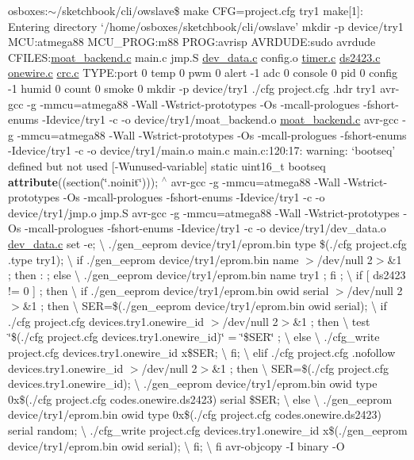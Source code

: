 osboxes\-:$\sim$/sketchbook/cli/owslave\$ make C\-F\-G=project.\-cfg try1 make\mbox{[}1\mbox{]}\-: Entering directory `/home/osboxes/sketchbook/cli/owslave' mkdir -\/p device/try1 M\-C\-U\-:atmega88 M\-C\-U\-\_\-\-P\-R\-O\-G\-:m88 P\-R\-O\-G\-:avrisp A\-V\-R\-D\-U\-D\-E\-:sudo avrdude C\-F\-I\-L\-E\-S\-:\hyperlink{moat__backend_8c}{moat\-\_\-backend.\-c} main.\-c jmp.\-S \hyperlink{dev__data_8c}{dev\-\_\-data.\-c} config.\-o \hyperlink{timer_8c}{timer.\-c} \hyperlink{ds2423_8c}{ds2423.\-c} \hyperlink{onewire_8c}{onewire.\-c} \hyperlink{crc_8c}{crc.\-c} T\-Y\-P\-E\-:port 0 temp 0 pwm 0 alert -\/1 adc 0 console 0 pid 0 config -\/1 humid 0 count 0 smoke 0 mkdir -\/p device/try1 ./cfg project.\-cfg .hdr try1 avr-\/gcc -\/g -\/mmcu=atmega88 -\/\-Wall -\/\-Wstrict-\/prototypes -\/\-Os -\/mcall-\/prologues -\/fshort-\/enums -\/\-Idevice/try1 -\/c -\/o device/try1/moat\-\_\-backend.\-o \hyperlink{moat__backend_8c}{moat\-\_\-backend.\-c} avr-\/gcc -\/g -\/mmcu=atmega88 -\/\-Wall -\/\-Wstrict-\/prototypes -\/\-Os -\/mcall-\/prologues -\/fshort-\/enums -\/\-Idevice/try1 -\/c -\/o device/try1/main.\-o main.\-c main.\-c\-:120\-:17\-: warning\-: ‘bootseq’ defined but not used \mbox{[}-\/\-Wunused-\/variable\mbox{]} static uint16\-\_\-t bootseq {\bfseries attribute}((section(\char`\"{}.\-noinit\char`\"{}))); $^\wedge$ avr-\/gcc -\/g -\/mmcu=atmega88 -\/\-Wall -\/\-Wstrict-\/prototypes -\/\-Os -\/mcall-\/prologues -\/fshort-\/enums -\/\-Idevice/try1 -\/c -\/o device/try1/jmp.\-o jmp.\-S avr-\/gcc -\/g -\/mmcu=atmega88 -\/\-Wall -\/\-Wstrict-\/prototypes -\/\-Os -\/mcall-\/prologues -\/fshort-\/enums -\/\-Idevice/try1 -\/c -\/o device/try1/dev\-\_\-data.\-o \hyperlink{dev__data_8c}{dev\-\_\-data.\-c} set -\/e; \textbackslash{} ./gen\-\_\-eeprom device/try1/eprom.\-bin type \$(./cfg project.\-cfg .type try1); \textbackslash{} if ./gen\-\_\-eeprom device/try1/eprom.\-bin name $>$/dev/null 2$>$\&1 ; then \-: ; else \textbackslash{} ./gen\-\_\-eeprom device/try1/eprom.\-bin name try1 ; fi ; \textbackslash{} if \mbox{[} ds2423 != 0 \mbox{]} ; then \textbackslash{} if ./gen\-\_\-eeprom device/try1/eprom.\-bin owid serial $>$/dev/null 2$>$\&1 ; then \textbackslash{} S\-E\-R=\$(./gen\-\_\-eeprom device/try1/eprom.\-bin owid serial); \textbackslash{} if ./cfg project.\-cfg devices.\-try1.\-onewire\-\_\-id $>$/dev/null 2$>$\&1 ; then \textbackslash{} test \char`\"{}\$(./cfg project.\-cfg devices.\-try1.\-onewire\-\_\-id)\char`\"{} = \char`\"{}\$\-S\-E\-R\char`\"{} ; \textbackslash{} else \textbackslash{} ./cfg\-\_\-write project.\-cfg devices.\-try1.\-onewire\-\_\-id x\$\-S\-E\-R; \textbackslash{} fi; \textbackslash{} elif ./cfg project.\-cfg .nofollow devices.\-try1.\-onewire\-\_\-id $>$/dev/null 2$>$\&1 ; then \textbackslash{} S\-E\-R=\$(./cfg project.\-cfg devices.\-try1.\-onewire\-\_\-id); \textbackslash{} ./gen\-\_\-eeprom device/try1/eprom.\-bin owid type 0x\$(./cfg project.\-cfg codes.\-onewire.\-ds2423) serial \$\-S\-E\-R; \textbackslash{} else \textbackslash{} ./gen\-\_\-eeprom device/try1/eprom.\-bin owid type 0x\$(./cfg project.\-cfg codes.\-onewire.\-ds2423) serial random; \textbackslash{} ./cfg\-\_\-write project.\-cfg devices.\-try1.\-onewire\-\_\-id x\$(./gen\-\_\-eeprom device/try1/eprom.\-bin owid serial); \textbackslash{} fi; \textbackslash{} fi avr-\/objcopy -\/\-I binary -\/\-O 
